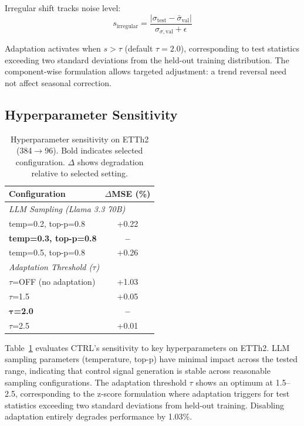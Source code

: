 Irregular shift tracks noise level:
\begin{equation}
s_\text{irregular} = \frac{|\sigma_\text{test} - \bar{\sigma}_\text{val}|}{\sigma_{\sigma,\text{val}} + \epsilon}
\end{equation}

Adaptation activates when $s > \tau$ (default $\tau=2.0$), corresponding to test statistics exceeding two standard deviations from the held-out training distribution. The component-wise formulation allows targeted adjustment: a trend reversal need not affect seasonal correction.


\subsection{Hyperparameter Sensitivity}

\begin{table}[H]

\centering
\small
\begin{tabular}{lc}
\toprule
\textbf{Configuration} & $\Delta$\textbf{MSE (\%)} \\
\midrule
\multicolumn{2}{l}{\textit{LLM Sampling (Llama 3.3 70B)}} \\
\quad temp=0.2, top-p=0.8 & +0.22 \\
\quad \textbf{temp=0.3, top-p=0.8} & \textbf{--} \\
\quad temp=0.5, top-p=0.8 & +0.26 \\
\midrule
\multicolumn{2}{l}{\textit{Adaptation Threshold ($\tau$)}} \\
\quad $\tau$=OFF (no adaptation) & +1.03 \\
\quad $\tau$=1.5 & +0.05 \\
\quad $\boldsymbol{\tau}$\textbf{=2.0} & \textbf{--} \\
\quad $\tau$=2.5 & +0.01 \\
\bottomrule
\end{tabular}

\caption{Hyperparameter sensitivity on ETTh2 (384$\to$96). Bold indicates selected configuration. $\Delta$ shows degradation relative to selected setting.}
\label{tab:hparam_sensitivity}
\end{table}

Table~\ref{tab:hparam_sensitivity} evaluates CTRL's sensitivity to key hyperparameters on ETTh2. LLM sampling parameters (temperature, top-p) have minimal impact across the tested range, indicating that control signal generation is stable across reasonable sampling configurations. The adaptation threshold $\tau$ shows an optimum at 1.5--2.5, corresponding to the z-score formulation where adaptation triggers for test statistics exceeding two standard deviations from held-out training. Disabling adaptation entirely degrades performance by 1.03\%. 


